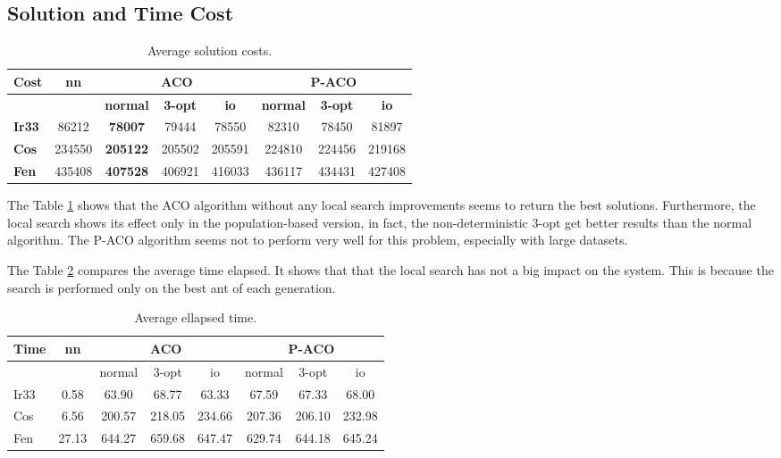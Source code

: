 \documentclass[a4paper,9pt,journal,twoside,compsoc]{PPIEEEtran}
\begin{document}
\subsection{Solution and Time Cost}

\begin{table}[h!]
\caption{Average solution costs.}
\scriptsize
\renewcommand{\arraystretch}{1}
\begin{tabular}{|l|c|c|c|c|c|c|c|}
\hline
 \textbf{Cost} & \textbf{nn}        & \multicolumn{3}{c|}{\textbf{ACO}}          & \multicolumn{3}{c|}{\textbf{P-ACO}}         \\ \hline
     &        & \textbf{normal}    & \textbf{3-opt}     &  \textbf{io}      & \textbf{normal}    & \textbf{3-opt}     &  \textbf{io}      \\ \hline
\textbf{Ir33} & 86212  & \textbf{78007}  & 79444  & 78550  & 82310  & 78450  & 81897  \\ \hline
\textbf{Cos}  & 234550 & \textbf{205122} & 205502 & 205591 & 224810 & 224456 & 219168 \\ \hline
\textbf{Fen}  & 435408 & \textbf{407528} & 406921 & 416033 & 436117 & 434431 & 427408 \\ \hline
\end{tabular}

\label{tab:solcost}
\end{table}

The Table \ref{tab:solcost} shows that the ACO algorithm without any local search improvements seems to return the best solutions. Furthermore, the local search shows its effect only in the population-based version, in fact, the non-deterministic 3-opt get better results than the normal algorithm. The P-ACO algorithm seems not to perform very well for this problem, especially with large datasets.

The Table \ref{tab:soltime} compares the average time elapsed. It shows that that the local search has not a big impact on the system. This is because the search is performed only on the best ant of each generation.

\begin{table}[h!]
\caption{Average ellapsed time.}
\scriptsize
\begin{tabular}{|l|c|c|c|c|c|c|c|}
\hline
Time & nn    & \multicolumn{3}{c|}{ACO}  & \multicolumn{3}{c|}{P-ACO}         \\ \hline
     &       & normal & 3-opt  &  io    & normal & 3-opt  &  io      \\ \hline
Ir33 & 0.58  & 63.90  & 68.77  & 63.33   & 67.59  & 67.33  & 68.00  \\ \hline
Cos  & 6.56  & 200.57 & 218.05 & 234.66  & 207.36 & 206.10 & 232.98 \\ \hline
Fen  & 27.13 & 644.27 & 659.68 & 647.47  & 629.74 & 644.18 & 645.24 \\ \hline
\end{tabular}
\label{tab:soltime}
\end{table}
\end{document}

